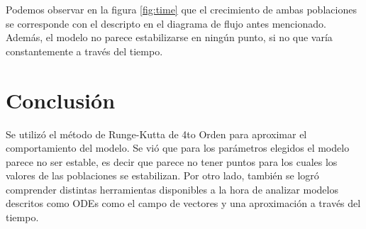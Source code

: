 \documentclass [a4paper,12pt,oneside,final]{article}
\begin{document}
Podemos observar en la figura \ref{fig:time} que el crecimiento de ambas poblaciones se corresponde con el descripto en el diagrama de flujo antes mencionado. Además, el modelo no parece estabilizarse en ningún punto, si no que varía constantemente a través del tiempo.

\section{Conclusión}

Se utilizó el método de Runge-Kutta de 4to Orden para aproximar el comportamiento del modelo. Se vió que para los parámetros elegidos el modelo parece no ser estable, es decir que parece no tener puntos para los cuales los valores de las poblaciones se estabilizan. Por otro lado, también se logró comprender distintas herramientas disponibles a la hora de analizar modelos descritos como ODEs como el campo de vectores y una aproximación a través del tiempo.
\end{document}
